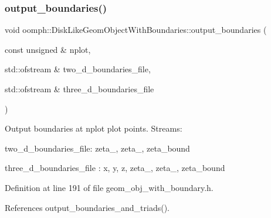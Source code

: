 \subsubsection{\texorpdfstring{output\+\_\+boundaries()}{output\_boundaries()}}
{\footnotesize\ttfamily void oomph\+::\+Disk\+Like\+Geom\+Object\+With\+Boundaries\+::output\+\_\+boundaries (\begin{DoxyParamCaption}\item[{const unsigned \&}]{nplot,  }\item[{std\+::ofstream \&}]{two\+\_\+d\+\_\+boundaries\+\_\+file,  }\item[{std\+::ofstream \&}]{three\+\_\+d\+\_\+boundaries\+\_\+file }\end{DoxyParamCaption})\hspace{0.3cm}{\ttfamily [inline]}}



Output boundaries at nplot plot points. Streams\+: 


\begin{DoxyItemize}
\item two\+\_\+d\+\_\+boundaries\+\_\+file\+: zeta\+\_, zeta\+\_, zeta\+\_\+bound
\item three\+\_\+d\+\_\+boundaries\+\_\+file \+: x, y, z, zeta\+\_, zeta\+\_, zeta\+\_\+bound 
\end{DoxyItemize}

Definition at line 191 of file geom\+\_\+obj\+\_\+with\+\_\+boundary.\+h.



References output\+\_\+boundaries\+\_\+and\+\_\+triads().

\mbox{\label{classoomph_1_1DiskLikeGeomObjectWithBoundaries_a5817503e1416b8ec99de7c25dff0213c}} 
